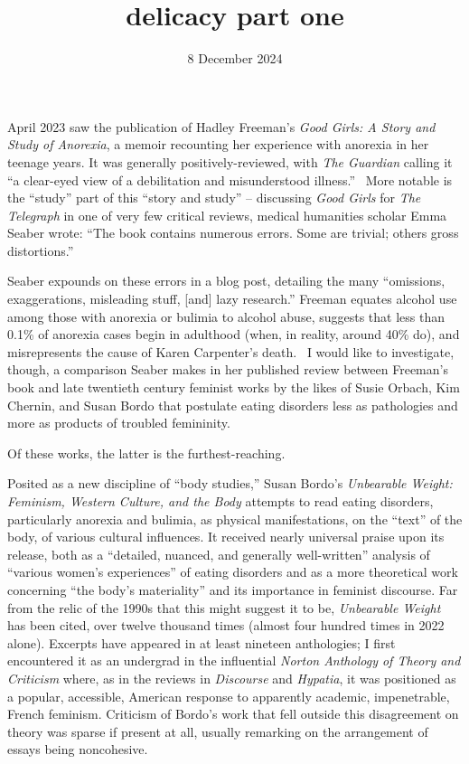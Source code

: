 \documentclass[11pt]{article}
\title{delicacy part one}
\date{8 December 2024}
\newcommand{\BExcerpt}{}
\newcommand{\EExcerpt}{}
\begin{document}
    \maketitle
    April 2023 saw the publication of Hadley Freeman's \textit{Good Girls: A Story and Study of Anorexia}, a memoir recounting her experience with anorexia in her teenage years. It was generally positively-reviewed, with \textit{The Guardian} calling it ``a clear-eyed view of a debilitation and misunderstood illness.''~ More notable is the ``study'' part of this ``story and study'' -- discussing \textit{Good Girls} for \textit{The Telegraph} in one of very few critical reviews, medical humanities scholar Emma Seaber wrote: ``The book contains numerous errors. Some are trivial; others gross distortions.''~ 

    Seaber expounds on these errors in a blog post, detailing the many ``omissions, exaggerations, misleading stuff, [and] lazy research.'' Freeman equates alcohol use among those with anorexia or bulimia to alcohol abuse, suggests that less than 0.1\% of anorexia cases begin in adulthood (when, in reality, around 40\% do), and misrepresents the cause of Karen Carpenter's death.~ I would like to investigate, though, a comparison Seaber makes in her published review between Freeman's book and late twentieth century feminist works by the likes of Susie Orbach, Kim Chernin, and Susan Bordo that postulate eating disorders less as pathologies and more as products of troubled femininity.

    Of these works, the latter is the furthest-reaching.
    \BExcerpt
    Posited as a new discipline of ``body studies,'' Susan Bordo's \textit{Unbearable Weight: Feminism, Western Culture, and the Body} attempts to read eating disorders, particularly anorexia and bulimia, as physical manifestations, on the ``text'' of the body, of various cultural influences. It received nearly universal praise upon its release, both as a ``detailed, nuanced, and generally well-written'' analysis of ``various women's experiences'' of eating disorders and as a more theoretical work concerning ``the body's materiality'' and its importance in feminist discourse. Far from the relic of the 1990s that this might suggest it to be, \textit{Unbearable Weight} has been cited, over twelve thousand times (almost four hundred times in 2022 alone). Excerpts have appeared in at least nineteen anthologies; I first encountered it as an undergrad in the influential \textit{Norton Anthology of Theory and Criticism} where, as in the reviews in \textit{Discourse} and \textit{Hypatia}, it was positioned as a popular, accessible, American response to apparently academic, impenetrable, French feminism. Criticism of Bordo's work that fell outside this disagreement on theory was sparse if present at all, usually remarking on the arrangement of essays being noncohesive.~\autocites[176]{Green94}[153]{Hekman95}
    \EExcerpt
    
\end{document}
